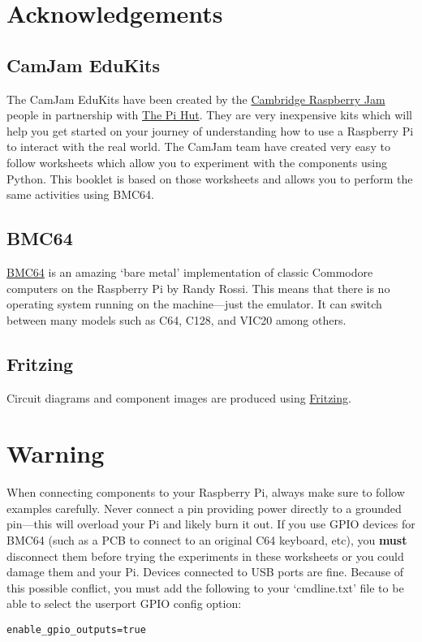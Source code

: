 \begin{titlepage}
\section*{Acknowledgements}

\subsection*{CamJam EduKits}


The CamJam EduKits have been created by the \href{https://camjam.me/}{Cambridge Raspberry Jam} people in partnership with \href{https://thepihut.com/collections/camjam-edukit}{The Pi Hut}.  They are very inexpensive kits which will help you get started on your journey of understanding how to use a Raspberry Pi to interact with the real world.  The CamJam team have created very easy to follow worksheets which allow you to experiment with the components using Python.  This booklet is based on those worksheets and allows you to perform the same activities using BMC64.

\subsection*{BMC64}

\href{https://github.com/randyrossi/bmc64}{BMC64} is an amazing `bare metal' implementation of classic Commodore computers on the Raspberry Pi by Randy Rossi.  This means that there is no operating system running on the machine---just the emulator.  It can switch between many models such as C64, C128, and VIC20 among others.

\subsection*{Fritzing}

Circuit diagrams and component images are produced using \href{https://fritzing.org/}{Fritzing}.
\vfill
\section*{\color{red}Warning}

When connecting components to your Raspberry Pi, always make sure to follow examples carefully.  Never connect a pin providing power directly to a grounded pin---this will overload your Pi and likely burn it out.  If you use GPIO devices for BMC64 (such as a PCB to connect to an original C64 keyboard, etc), you \textbf{must} disconnect them before trying the experiments in these worksheets or you could damage them and your Pi.  Devices connected to USB ports are fine.  Because of this possible conflict, you must add the following to your `cmdline.txt' file to be able to select the userport GPIO config option:
\begin{verbatim}
enable_gpio_outputs=true
\end{verbatim}

\end{titlepage}

